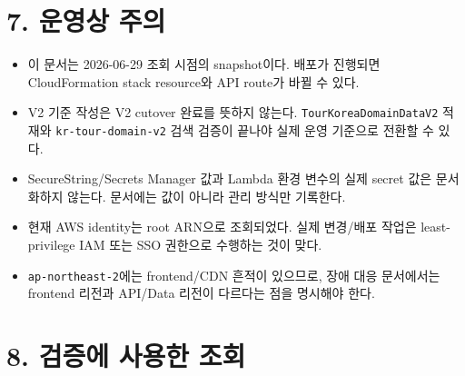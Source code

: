 \documentclass[12pt,a4paper]{article}
\newcommand{\DocNeedspace}[1]{\par\ifdim\dimexpr\pagegoal-\pagetotal\relax<#1\newpage\fi}
\newcommand{\TocNoChildTight}{\vspace{-0.28em}}
\begin{document}
\newpage

\DocNeedspace{10\baselineskip}
\section*{7. 운영상 주의}
\addtocontents{toc}{\protect\TocNoChildTight}


\begin{itemize}
\item 이 문서는 2026-06-29 조회 시점의 snapshot이다. 배포가 진행되면 CloudFormation stack resource와 API route가 바뀔 수 있다.
\item V2 기준 작성은 V2 cutover 완료를 뜻하지 않는다. \texttt{Tour\allowbreak{}Korea\allowbreak{}Domain\allowbreak{}Data\allowbreak{}V2} 적재와 \texttt{kr-\allowbreak{}tour-\allowbreak{}domain-\allowbreak{}v2} 검색 검증이 끝나야 실제 운영 기준으로 전환할 수 있다.
\item SecureString/Secrets Manager 값과 Lambda 환경 변수의 실제 secret 값은 문서화하지 않는다. 문서에는 값이 아니라 관리 방식만 기록한다.
\item 현재 AWS identity는 root ARN으로 조회되었다. 실제 변경/배포 작업은 least-privilege IAM 또는 SSO 권한으로 수행하는 것이 맞다.
\item \texttt{ap-\allowbreak{}northeast-\allowbreak{}2}에는 frontend/CDN 흔적이 있으므로, 장애 대응 문서에서는 frontend 리전과 API/Data 리전이 다르다는 점을 명시해야 한다.
\end{itemize}


\newpage

\DocNeedspace{10\baselineskip}
\section*{8. 검증에 사용한 조회}
\addtocontents{toc}{\protect\TocNoChildTight}
\end{document}
